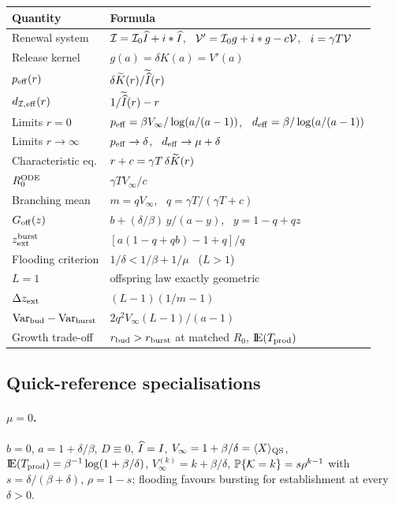 \begin{center}
\renewcommand{\arraystretch}{1.3}
\small
\begin{tabular}{@{}p{}p{}@{}}
\toprule
Quantity & Formula \\
\midrule
Renewal system & $\mathcal{I}=\mathcal{I}_0\widehat{I}+i*\widehat{I}$, \ $\mathcal{V}'=\mathcal{I}_0 g+i*g-c\mathcal{V}$, \ $i=\gamma T\mathcal{V}$ \\
Release kernel & $g(a)=\delta K(a)=V'(a)$ \\
$p_{\rm eff}(r)$ & $\delta\widetilde{K}(r)/\widetilde{\widehat{I}}(r)$ \\
$d_{\mathcal{I},{\rm eff}}(r)$ & $1/\widetilde{\widehat{I}}(r)-r$ \\
Limits $r=0$ & $p_{\rm eff}=\beta V_\infty/\log(a/(a-1))$, \ $d_{\rm eff}=\beta/\log(a/(a-1))$ \\
Limits $r\to\infty$ & $p_{\rm eff}\to\delta$, \ $d_{\rm eff}\to\mu+\delta$ \\
Characteristic eq. & $r+c=\gamma T\,\delta\widetilde{K}(r)$ \\
$R_0^{\rm ODE}$ & $\gamma T V_\infty/c$ \\
Branching mean & $m=qV_\infty$, \ $q=\gamma T/(\gamma T+c)$ \\
$G_{\rm off}(z)$ & $b+(\delta/\beta)\,y/(a-y)$, \ $y=1-q+qz$ \\
$z_{\rm ext}^{\rm burst}$ & $[a(1-q+qb)-1+q]/q$ \\
Flooding criterion & $1/\delta<1/\beta+1/\mu$ \ ($L>1$) \\
$L=1$ & offspring law exactly geometric \\
$\Delta z_{\rm ext}$ & $(L-1)(1/m-1)$ \\
$\mathrm{Var}_{\rm bud}-\mathrm{Var}_{\rm burst}$ & $2q^2V_\infty(L-1)/(a-1)$ \\
Growth trade-off & $r_{\rm bud}>r_{\rm burst}$ at matched $R_0$, ${\rm I}\!{\rm E}(T_{\rm prod})$ \\
\bottomrule
\end{tabular}
\end{center}

\subsection*{Quick-reference specialisations}

\paragraph{$\mu=0$.} $b=0$, $a=1+\delta/\beta$, $D\equiv0$, $\widehat{I}=I$,
$V_\infty=1+\beta/\delta=\langle X\rangle_{\rm QS}$,
${\rm I}\!{\rm E}(T_{\rm prod})=\beta^{-1}\log(1+\beta/\delta)$,
$V_\infty^{(k)}=k+\beta/\delta$,
$\mathbb{P}\!\left\{\mathcal{K}=k\right\}=s\rho^{k-1}$ with $s=\delta/(\beta+\delta)$, $\rho=1-s$;
flooding favours bursting for establishment at every $\delta>0$.

